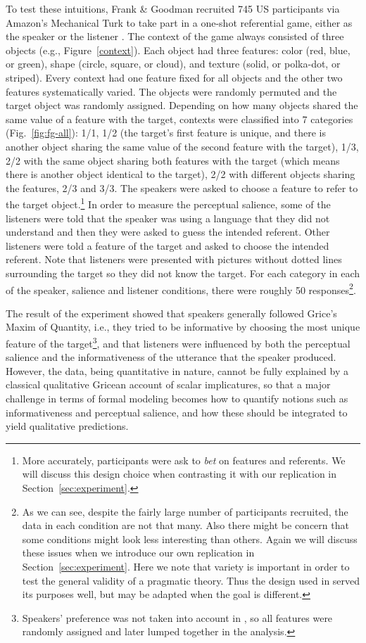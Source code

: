 To test these intuitions, Frank \& Goodman recruited 745 US
participants via Amazon's Mechanical Turk to take part in a one-shot
referential game, either as the speaker or the listener \cite{Frank}.
The context of the game always consisted of three objects (e.g.,
Figure~\ref{context}).  Each object had three features: color (red,
blue, or green), shape (circle, square, or cloud), and texture (solid,
or polka-dot, or striped).  Every context had one feature fixed for
all objects and the other two features systematically varied.  The
objects were randomly permuted and the target object was randomly
assigned.  Depending on how many objects shared the same value of a
feature with the target, contexts were classified into 7 categories
(Fig.~\ref{fig:fg-all}):
1/1, 1/2 (the target's first feature is unique, and there is another
object sharing the same value of the second feature with the target),
1/3, 2/2 with the same object sharing both features with the target
(which means there is another object identical to the target), 2/2
with different objects sharing the features, 2/3 and 3/3.  
The speakers were asked to choose a
feature to refer to the target object.\footnote{More accurately,
  participants were ask to \emph{bet} on features and referents. We
  will discuss this design choice when contrasting it with our 
  replication in Section~\ref{sec:experiment}.}  In order
to measure the perceptual salience, some of the listeners were told
that the speaker was using a language that they did not understand and
then they were asked to guess the intended referent.  Other listeners
were told a feature of the target and asked to choose the intended
referent. 
Note that listeners were presented with pictures without dotted lines 
surrounding the target so they did not know the target.
For each category in each of the speaker, salience and listener conditions, 
there were roughly 50 responses\footnote{As we can see, despite the fairly 
large number of participants recruited, the data in each condition 
are not that many. Also there might be concern that some conditions might 
look less interesting than others. Again we will discuss these issues when 
we introduce our own replication in Section~\ref{sec:experiment}. Here
we note that variety is important in order to test the general validity of 
a pragmatic theory. 
Thus the design used in \cite{Frank} served its purposes well, but may be 
adapted when the goal is different.}.

The result of the experiment showed that speakers generally followed
Grice's Maxim of Quantity, i.e., they tried to be informative by
choosing the most unique feature of the target\footnote{Speakers' preference
was not taken into account in \cite{Frank}, so all features were randomly 
assigned and later lumped together in the analysis.}, and that listeners
were influenced by both the perceptual salience and the
informativeness of the utterance that the speaker produced. However,
the data, being quantitative in nature, cannot be fully explained by a
classical qualitative Gricean account of scalar implicatures, so that
a major challenge in terms of formal modeling becomes how to quantify
notions such as informativeness and perceptual salience, and how these
should be integrated to yield qualitative predictions.

